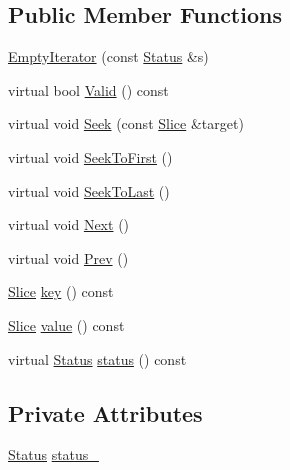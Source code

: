 \subsection*{Public Member Functions}
\begin{DoxyCompactItemize}
\item 
\hyperlink{classleveldb_1_1anonymous__namespace_02iterator_8cc_03_1_1_empty_iterator_a669db7f97fc4a1e44c9a3934895b4528}{Empty\+Iterator} (const \hyperlink{classleveldb_1_1_status}{Status} \&s)
\item 
virtual bool \hyperlink{classleveldb_1_1anonymous__namespace_02iterator_8cc_03_1_1_empty_iterator_a40f69c339b2ddacb04b696344c3cf106}{Valid} () const 
\item 
virtual void \hyperlink{classleveldb_1_1anonymous__namespace_02iterator_8cc_03_1_1_empty_iterator_ae64a43d5a8bce6a8e38da3a5ddd5ca5f}{Seek} (const \hyperlink{classleveldb_1_1_slice}{Slice} \&target)
\item 
virtual void \hyperlink{classleveldb_1_1anonymous__namespace_02iterator_8cc_03_1_1_empty_iterator_a090f188b71e1daa79fe2738dcc655566}{Seek\+To\+First} ()
\item 
virtual void \hyperlink{classleveldb_1_1anonymous__namespace_02iterator_8cc_03_1_1_empty_iterator_a9ba5b11f3730923474f6599987cf5829}{Seek\+To\+Last} ()
\item 
virtual void \hyperlink{classleveldb_1_1anonymous__namespace_02iterator_8cc_03_1_1_empty_iterator_a803ee20e8ca80b6ff28c05640f2ad0c4}{Next} ()
\item 
virtual void \hyperlink{classleveldb_1_1anonymous__namespace_02iterator_8cc_03_1_1_empty_iterator_a8f6baac3690f2b97442e6d4c4b33a3ad}{Prev} ()
\item 
\hyperlink{classleveldb_1_1_slice}{Slice} \hyperlink{classleveldb_1_1anonymous__namespace_02iterator_8cc_03_1_1_empty_iterator_a35d33d6c74920f95560dbad9dd2f1752}{key} () const 
\item 
\hyperlink{classleveldb_1_1_slice}{Slice} \hyperlink{classleveldb_1_1anonymous__namespace_02iterator_8cc_03_1_1_empty_iterator_a7e0b106224faefb1961cb25d7d65a4d8}{value} () const 
\item 
virtual \hyperlink{classleveldb_1_1_status}{Status} \hyperlink{classleveldb_1_1anonymous__namespace_02iterator_8cc_03_1_1_empty_iterator_a68fb3441aedfb69ef99363ebfb15cac4}{status} () const 
\end{DoxyCompactItemize}
\subsection*{Private Attributes}
\begin{DoxyCompactItemize}
\item 
\hyperlink{classleveldb_1_1_status}{Status} \hyperlink{classleveldb_1_1anonymous__namespace_02iterator_8cc_03_1_1_empty_iterator_ab74718f61154561ae3a8490d05f4da20}{status\+\_\+}
\end{DoxyCompactItemize}
